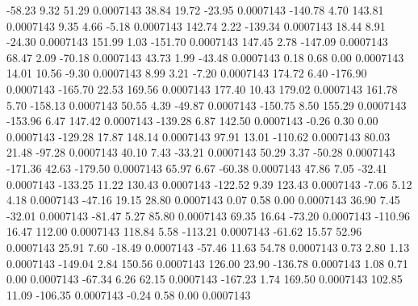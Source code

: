       -58.23        9.32       51.29     0.0007143
       38.84       19.72      -23.95     0.0007143
     -140.78        4.70      143.81     0.0007143
        9.35        4.66       -5.18     0.0007143
      142.74        2.22     -139.34     0.0007143
       18.44        8.91      -24.30     0.0007143
      151.99        1.03     -151.70     0.0007143
      147.45        2.78     -147.09     0.0007143
       68.47        2.09      -70.18     0.0007143
       43.73        1.99      -43.48     0.0007143
        0.18        0.68        0.00     0.0007143
       14.01       10.56       -9.30     0.0007143
        8.99        3.21       -7.20     0.0007143
      174.72        6.40     -176.90     0.0007143
     -165.70       22.53      169.56     0.0007143
      177.40       10.43      179.02     0.0007143
      161.78        5.70     -158.13     0.0007143
       50.55        4.39      -49.87     0.0007143
     -150.75        8.50      155.29     0.0007143
     -153.96        6.47      147.42     0.0007143
     -139.28        6.87      142.50     0.0007143
       -0.26        0.30        0.00     0.0007143
     -129.28       17.87      148.14     0.0007143
       97.91       13.01     -110.62     0.0007143
       80.03       21.48      -97.28     0.0007143
       40.10        7.43      -33.21     0.0007143
       50.29        3.37      -50.28     0.0007143
     -171.36       42.63     -179.50     0.0007143
       65.97        6.67      -60.38     0.0007143
       47.86        7.05      -32.41     0.0007143
     -133.25       11.22      130.43     0.0007143
     -122.52        9.39      123.43     0.0007143
       -7.06        5.12        4.18     0.0007143
      -47.16       19.15       28.80     0.0007143
        0.07        0.58        0.00     0.0007143
       36.90        7.45      -32.01     0.0007143
      -81.47        5.27       85.80     0.0007143
       69.35       16.64      -73.20     0.0007143
     -110.96       16.47      112.00     0.0007143
      118.84        5.58     -113.21     0.0007143
      -61.62       15.57       52.96     0.0007143
       25.91        7.60      -18.49     0.0007143
      -57.46       11.63       54.78     0.0007143
        0.73        2.80        1.13     0.0007143
     -149.04        2.84      150.56     0.0007143
      126.00       23.90     -136.78     0.0007143
        1.08        0.71        0.00     0.0007143
      -67.34        6.26       62.15     0.0007143
     -167.23        1.74      169.50     0.0007143
      102.85       11.09     -106.35     0.0007143
       -0.24        0.58        0.00     0.0007143
